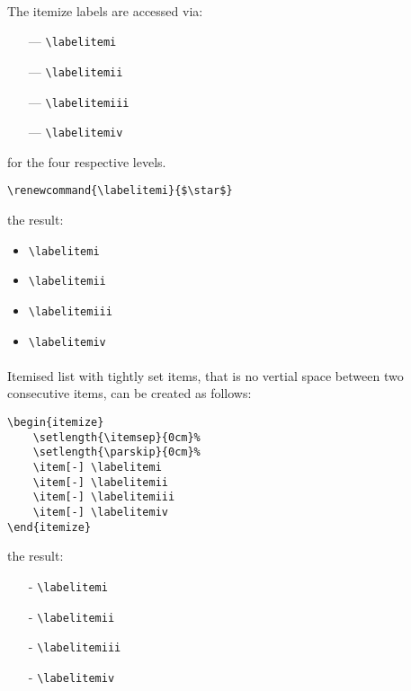 {\paragraph{}
The itemize labels are accessed via:
\begin{itemize}
	\itemsep1pt \parskip0pt 
	\item[---] \verb|\labelitemi|
	\item[---] \verb|\labelitemii|
	\item[---] \verb|\labelitemiii|
	\item[---] \verb|\labelitemiv|
\end{itemize}
for the four respective levels.
\begin{verbatim}
\renewcommand{\labelitemi}{$\star$}
\end{verbatim}
the result:
\renewcommand{\labelitemi}{$\star$}
\begin{itemize}
	\itemsep1pt \parskip0pt 
	\item \verb|\labelitemi|
	\item \verb|\labelitemii|
	\item \verb|\labelitemiii|
	\item \verb|\labelitemiv|
\end{itemize}

\paragraph{}
Itemised list with tightly set items, that is no vertial space between two
consecutive items, can be created as follows:
\begin{verbatim}
\begin{itemize}
	\setlength{\itemsep}{0cm}%
	\setlength{\parskip}{0cm}%
	\item[-] \labelitemi
	\item[-] \labelitemii
	\item[-] \labelitemiii
	\item[-] \labelitemiv
\end{itemize}
\end{verbatim}
the result:
\begin{itemize}
	\setlength{\itemsep}{0cm}%
	\setlength{\parskip}{0cm}%
	\item[-] \verb|\labelitemi|
	\item[-] \verb|\labelitemii|
	\item[-] \verb|\labelitemiii|
	\item[-] \verb|\labelitemiv|
\end{itemize}
}
